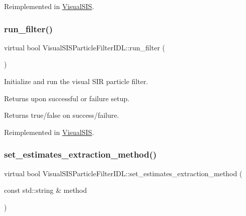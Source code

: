 Reimplemented in \hyperlink{classVisualSIS_a974ca828135835ccb4a2c3b7635b2aea}{Visual\+S\+IS}.

\mbox{\label{classVisualSISParticleFilterIDL_a6a8c16192597ea78617f10691b07df08}} 
\subsubsection{\texorpdfstring{run\+\_\+filter()}{run\_filter()}}
{\footnotesize\ttfamily virtual bool Visual\+S\+I\+S\+Particle\+Filter\+I\+D\+L\+::run\+\_\+filter (\begin{DoxyParamCaption}{ }\end{DoxyParamCaption})\hspace{0.3cm}{\ttfamily [virtual]}}



Initialize and run the visual S\+IR particle filter. 

Returns upon successful or failure setup. \begin{DoxyReturn}{Returns}
true/false on success/failure. 
\end{DoxyReturn}


Reimplemented in \hyperlink{classVisualSIS_aa8ad54a90c9f1f6ca673d8d61721b7be}{Visual\+S\+IS}.

\mbox{\label{classVisualSISParticleFilterIDL_ac5f296082bd83e1ee1b74e9af16e856a}} 
\subsubsection{\texorpdfstring{set\+\_\+estimates\+\_\+extraction\+\_\+method()}{set\_estimates\_extraction\_method()}}
{\footnotesize\ttfamily virtual bool Visual\+S\+I\+S\+Particle\+Filter\+I\+D\+L\+::set\+\_\+estimates\+\_\+extraction\+\_\+method (\begin{DoxyParamCaption}\item[{const std\+::string \&}]{method }\end{DoxyParamCaption})\hspace{0.3cm}{\ttfamily [virtual]}}



